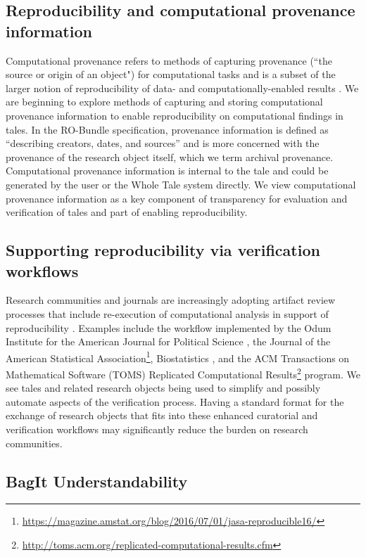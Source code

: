 \documentclass[conference]{IEEEtran}
\begin{document}
\subsection{Reproducibility and computational provenance information}
Computational provenance refers to methods of capturing provenance (``the source or origin of an object") for computational tasks \cite{freire2008} and is a subset of the larger notion of reproducibility of data- and computationally-enabled results \cite{stodden2013a, stodden2014a, stodden2014b, stodden2015, stodden2016}. We are beginning to explore methods of capturing and storing computational provenance information to enable reproducibility on computational findings in tales. In the RO-Bundle specification, provenance information is defined as ``describing creators, dates, and sources'' and is more concerned with the provenance of the research object itself, which we term archival provenance. Computational provenance information is internal to the tale and could be generated by the user or the Whole Tale system directly. We view computational provenance information as a key component of transparency for evaluation and verification of tales and part of enabling reproducibility.

\subsection{Supporting reproducibility via verification workflows}
Research communities and journals are increasingly adopting artifact review processes that include re-execution of computational analysis in support of reproducibility \cite{stodden2013b}. Examples include the workflow implemented by the Odum Institute for the American Journal for Political Science \cite{christian2018}, the Journal of the American Statistical Association\footnote{\url{https://magazine.amstat.org/blog/2016/07/01/jasa-reproducible16/}}, Biostatistics \cite{donoho2010}, and the ACM Transactions on Mathematical Software (TOMS) Replicated Computational Results\footnote{\url{http://toms.acm.org/replicated-computational-results.cfm}} program. We see tales and related research objects being used to simplify and possibly automate aspects of the verification process. Having a standard format for the exchange of research objects that fits into these enhanced curatorial and verification workflows may significantly reduce the burden on research communities.


\subsection{BagIt Understandability}
\end{document}
